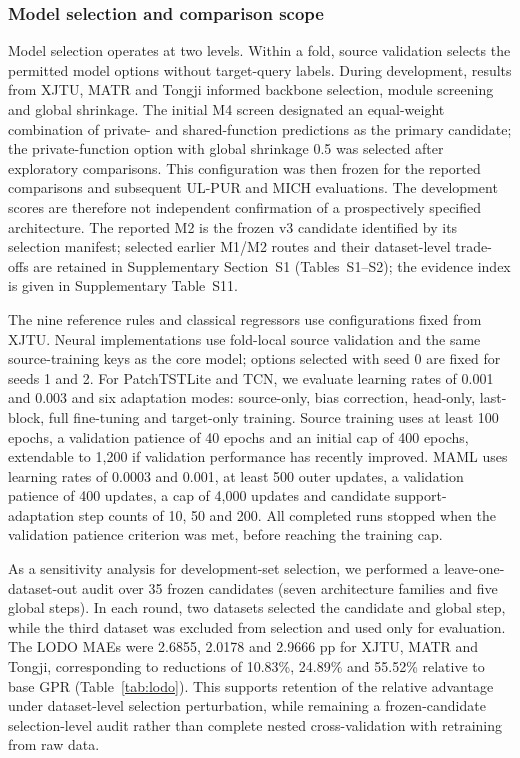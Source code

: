 \documentclass[preprint,12pt]{elsarticle}
\begin{document}
\subsubsection{Model selection and comparison scope}
Model selection operates at two levels. Within a fold, source validation selects the permitted model options without target-query labels. During development, results from XJTU, MATR and Tongji informed backbone selection, module screening and global shrinkage. The initial M4 screen designated an equal-weight combination of private- and shared-function predictions as the primary candidate; the private-function option with global shrinkage 0.5 was selected after exploratory comparisons. This configuration was then frozen for the reported comparisons and subsequent UL-PUR and MICH evaluations. The development scores are therefore not independent confirmation of a prospectively specified architecture. The reported M2 is the frozen v3 candidate identified by its selection manifest; selected earlier M1/M2 routes and their dataset-level trade-offs are retained in Supplementary Section~S1 (Tables~S1--S2); the evidence index is given in Supplementary Table~S11.

The nine reference rules and classical regressors use configurations fixed from XJTU. Neural implementations use fold-local source validation and the same source-training keys as the core model; options selected with seed 0 are fixed for seeds 1 and 2. For PatchTSTLite and TCN, we evaluate learning rates of 0.001 and 0.003 and six adaptation modes: source-only, bias correction, head-only, last-block, full fine-tuning and target-only training. Source training uses at least 100 epochs, a validation patience of 40 epochs and an initial cap of 400 epochs, extendable to 1,200 if validation performance has recently improved. MAML uses learning rates of 0.0003 and 0.001, at least 500 outer updates, a validation patience of 400 updates, a cap of 4,000 updates and candidate support-adaptation step counts of 10, 50 and 200. All completed runs stopped when the validation patience criterion was met, before reaching the training cap.

As a sensitivity analysis for development-set selection, we performed a leave-one-dataset-out audit over 35 frozen candidates (seven architecture families and five global steps). In each round, two datasets selected the candidate and global step, while the third dataset was excluded from selection and used only for evaluation. The LODO MAEs were 2.6855, 2.0178 and 2.9666 pp for XJTU, MATR and Tongji, corresponding to reductions of 10.83\%, 24.89\% and 55.52\% relative to base GPR (Table~\ref{tab:lodo}). This supports retention of the relative advantage under dataset-level selection perturbation, while remaining a frozen-candidate selection-level audit rather than complete nested cross-validation with retraining from raw data.
\end{document}
